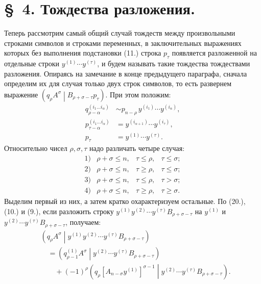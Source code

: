 \documentclass[11pt]{article}
\newcommand{\pair}[2]{\left(#1\middle|#2\right)}
\begin{document}
\section*{\S\ 4. Тождества разложения.}

Теперь рассмотрим самый общий случай тождеств между произвольными строками символов и строками переменных, в заключительных выражениях которых без выполнения подстановки (11.) строка $p_\tau$ появляется разложенной на отдельные строки $y^{(1)}\cdots y^{(\tau)}$, и будем называть такие тождества тождествами разложения. Опираясь на замечание в конце предыдущего параграфа, сначала определим их для случая только двух строк символов, то есть развернем выражение $\pair{q_\rho A^\sigma}{B_{\rho+\sigma-\tau}p_\tau}$. При этом положим:
\begin{equation}
\begin{aligned}
q_{\rho-\alpha}^{(i_1\ldots i_\alpha)}
&\sim p_{n-\rho}\,y^{(i_1)}\cdots y^{(i_\alpha)},\\
p_{\tau-\alpha}^{(i_1\ldots i_\alpha)}
&=y^{(i_{\alpha+1})}\cdots y^{(i_\tau)},\\
p_\tau&=y^{(1)}\cdots y^{(\tau)}.
\end{aligned}
\tag{22}
\end{equation}
Относительно чисел $\rho,\sigma,\tau$ надо различать четыре случая:
\[
\begin{array}{llll}
1)&\rho+\sigma\le n,& \tau\le\rho,& \tau\le\sigma;\\[2pt]
2)&\rho+\sigma\le n,& \tau\ge\rho,& \tau\le\sigma;\\[2pt]
3)&\rho+\sigma\le n,& \tau\le\rho,& \tau>\sigma;\\[2pt]
4)&\rho+\sigma\le n,& \tau\ge\rho,& \tau\ge\sigma.
\end{array}
\]
Выделим первый из них, а затем кратко охарактеризуем остальные. По (20.), (10.) и (9.), если разложить строку $y^{(1)}y^{(2)}\cdots y^{(\tau)}B_{\rho+\sigma-\tau}$ на $y^{(1)}$ и $y^{(2)}\cdots y^{(\tau)}B_{\rho+\sigma-\tau}$, получаем:
\begin{equation}
\begin{aligned}
&\pair{q_\rho A^\sigma}{y^{(1)}y^{(2)}\cdots y^{(\tau)}
B_{\rho+\sigma-\tau}}\\
&\quad=\pair{q_{\rho-1}^{(1)}A^\sigma}
{y^{(2)}\cdots y^{(\tau)}B_{\rho+\sigma-\tau}}\\
&\qquad+(-1)^\rho
\pair{q_\rho[A_{n-\sigma}y^{(1)}]^{\sigma-1}}
{y^{(2)}\cdots y^{(\tau)}B_{\rho+\sigma-\tau}}.
\end{aligned}
\tag{23}
\end{equation}
\end{document}
